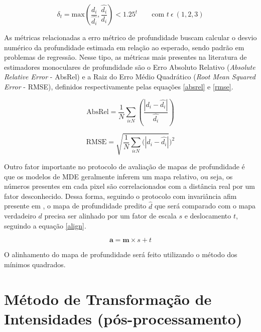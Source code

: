 \begin{equation}
    \delta_t = \text{max}\left( \frac{d_i}{\hat{d_i}}, \frac{\hat{d_i}}{d_i} \right) < 1.25^t \qquad \text{com } t \> \epsilon \> (1,2,3)
    \label{deltaeq}
\end{equation}

As métricas relacionadas a erro métrico de profundidade buscam calcular o desvio numérico da profundidade estimada em relação ao esperado, sendo padrão em problemas de regressão. Nesse tipo, as métricas mais presentes na literatura de estimadores monoculares de profundidade são o Erro Absoluto Relativo (\textit{Absolute Relative Error} - AbsRel) e a Raiz do Erro Médio Quadrático (\textit{Root Mean Squared Error} - RMSE), definidos respectivamente pelas equações \ref{absrel} e \ref{rmse}.


\begin{equation}
    \text{AbsRel} =\frac{1}{N} \sum_{i \epsilon N} (\frac{\left| d_i - \hat{d_i} \right|}{\hat{d_i}})
 \label{absrel}
\end{equation}

\begin{equation}
    \text{RMSE} = \sqrt{\frac{1}{N} \sum_{i \epsilon N} (\left| d_i - \hat{d_i} \right|})^2
 \label{rmse}
\end{equation}

Outro fator importante no protocolo de avaliação de mapas de profundidade é que os modelos de MDE geralmente inferem um mapa relativo, ou seja, os números presentes em cada pixel são correlacionados com a distância real por um fator desconhecido. Dessa forma, seguindo o protocolo com invariância afim presente em \cite{ke2024repurposing}, o mapa de profundidade predito $\hat{d}$ que será comparado com o mapa verdadeiro $d$ precisa ser alinhado por um fator de escala $s$ e deslocamento $t$, seguindo a equação \ref{align}.

\begin{equation}
    \textbf{a} = \textbf{m} \times s + t
    \label{align}
\end{equation}

O alinhamento do mapa de profundidade será feito utilizando o método dos mínimos quadrados.


\section{Método de Transformação de Intensidades (pós-processamento)}

